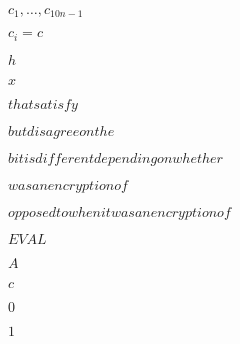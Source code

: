 \documentclass[10pt]{book}
\begin{document}
\begin{mdSnippets}
\begin{mdInlineSnippet}[f7286d5bf7cb9aa5117c87d10dbe730c]%
$c_1,\ldots,c_{10n-1}$\end{mdInlineSnippet}%
\begin{mdInlineSnippet}[707905635465f0336f7dc373b35d6713]%
$c_i=c$\end{mdInlineSnippet}%
\begin{mdInlineSnippet}[2510c39011c5be704182423e3a695e91]%
$h$\end{mdInlineSnippet}%
\begin{mdInlineSnippet}[9dd4e461268c8034f5c8564e155c67a6]%
$x$\end{mdInlineSnippet}%
\begin{mdInlineSnippet}[7a6032b4d9bc67f2e848746e8f53d2fc]%
$ that satisfy $\end{mdInlineSnippet}%
\begin{mdInlineSnippet}[afdbe8b16ac3e175cf50d527032dd8ae]%
$ but disagree on the $\end{mdInlineSnippet}%
\begin{mdInlineSnippet}[698e73bb40a7b029f34625856309e297]%
$ bit is different depending on whether  $\end{mdInlineSnippet}%
\begin{mdInlineSnippet}%
$ was an encryption of $\end{mdInlineSnippet}%
\begin{mdInlineSnippet}[77be21661088d2e72f1b55c273ec4760]%
$ opposed to when it was an encryption of $\end{mdInlineSnippet}%
\begin{mdInlineSnippet}[1f8cb46fe06733d6f0dd650117e6ab66]%
$EVAL$\end{mdInlineSnippet}%
\begin{mdInlineSnippet}[7fc56270e7a70fa81a5935b72eacbe29]%
$A$\end{mdInlineSnippet}%
\begin{mdInlineSnippet}[4a8a08f09d37b73795649038408b5f33]%
$c$\end{mdInlineSnippet}%
\begin{mdInlineSnippet}%
$0$\end{mdInlineSnippet}%
\begin{mdInlineSnippet}[c4ca4238a0b923820dcc509a6f75849b]%
$1$\end{mdInlineSnippet}%

\end{mdSnippets}
\end{document}
